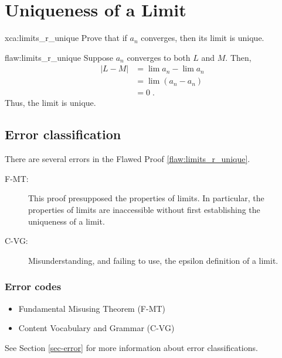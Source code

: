 \section{Uniqueness of a Limit}

\begin{xca}{xca:limits_r_unique}
Prove that if $a_n$ converges, then its limit is unique.
\end{xca}

\begin{flaw}{flaw:limits_r_unique} %
Suppose $a_n$ converges to both $L$ and $M.$ Then,
\begin{align*}
    |L - M | &= \lim a_n - \lim a_n \\
    &= \lim (a_n - a_n) \\
    &= 0\;.
\end{align*}
Thus, the limit is unique.
\end{flaw}

\clearpage
\subsection{Error classification}


There are several errors
 in the Flawed Proof \ref{flaw:limits_r_unique}. %


 \begin{description}
 	\item[F-MT: ] This proof presupposed the properties of limits. In particular, the properties of limits are inaccessible without first establishing the uniqueness of a limit.
 	\item[C-VG: ] Misunderstanding, and failing to use, the epsilon definition of a limit.
 \end{description}


\subsubsection{Error codes}
\begin{itemize}
	\item 	Fundamental Misusing Theorem (F-MT)
	\item   Content Vocabulary and Grammar (C-VG)
\end{itemize}
See Section \ref{sec-error} for more information about error classifications.

